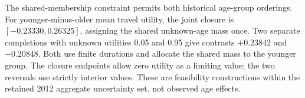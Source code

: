 The shared-membership constraint permits both historical age-group orderings. For younger-minus-older mean travel utility, the joint closure is $[-0.23330,0.26325]$, assigning the shared unknown-age mass once. Two separate completions with unknown utilities 0.05 and 0.95 give contrasts $+0.23842$ and $-0.20848$. Both use finite durations and allocate the shared mass to the younger group. The closure endpoints allow zero utility as a limiting value; the two reversals use strictly interior values. These are feasibility constructions within the retained 2012 aggregate uncertainty set, not observed age effects.
